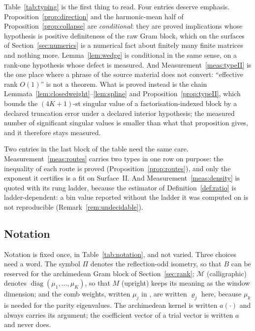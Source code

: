 \documentclass[11pt,a4paper]{article}
\theoremstyle{plain}
\theoremstyle{definition}
\newcommand{\MM}{\mathcal{M}}
\DeclareMathOperator{\diag}{diag}
\begin{document}
Table~\ref{tab:typing} is the first thing to read. Four entries deserve
emphasis. Proposition~\ref{prop:direction} and the harmonic-mean half of
Proposition~\ref{prop:collapse} are \emph{conditional}: they are proved
implications whose hypothesis is positive definiteness of the raw Gram block,
which on the surfaces of Section~\ref{sec:numerics} is a numerical fact about
finitely many finite matrices and nothing more. Lemma~\ref{lem:wedge} is
conditional in the same sense, on a rank-one hypothesis whose defect is
measured. And Measurement~\ref{meas:typeII} is the one place where a phrase of
the source material does not convert: ``effective rank $O(1)$'' is not a
theorem. What is proved instead is the chain
Lemmata~\ref{lem:closedweight}--\ref{lem:spline} and
Proposition~\ref{prop:typeII}, which bounds the $(4K+1)$-st singular value of a
factorisation-indexed block by a declared truncation error under a declared
interior hypothesis; the measured number of significant singular values is
smaller than what that proposition gives, and it therefore stays measured.

Two entries in the last block of the table need the same care.
Measurement~\ref{meas:routes} carries two types in one row on purpose: the
inequality of each route is proved (Proposition~\ref{prop:routes}), and only
the exponent it certifies is a fit on Surface~II. And
Measurement~\ref{meas:density} is quoted with its rung ladder, because the
estimator of Definition~\ref{def:ratio} is ladder-dependent: a bin value
reported without the ladder it was computed on is not reproducible
(Remark~\ref{rem:undecidable}).

\subsection{Notation}
\label{sec:notation}

Notation is fixed once, in Table~\ref{tab:notation}, and not varied. Three
choices need a word. The symbol $\Pi$ denotes the reflection-odd isometry, so
that $B$ can be reserved for the archimedean Gram block of
Section~\ref{sec:rank}; $\MM$ (calligraphic) denotes $\diag(\mu_1,\dots,\mu_K)$,
so that $M$ (upright) keeps its meaning as the window dimension; and the comb
weights, written $\mu_j$ in \cite{PaperI}, are written $\varrho_j$ here, because
$\mu_k$ is needed for the parity eigenvalues. The archimedean kernel is written
$a(\cdot)$ and always carries its argument; the coefficient vector of a trial
vector is written $a$ and never does.
\end{document}
